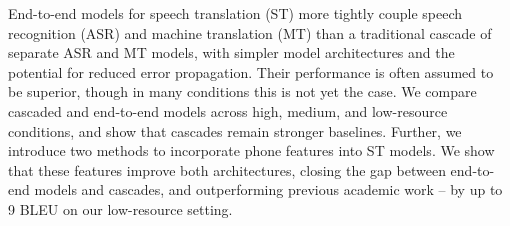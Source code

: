 End-to-end models for speech translation (ST) more tightly couple speech recognition (ASR) and machine translation (MT) than a traditional cascade of separate ASR and MT models, with simpler model architectures and the potential for reduced error propagation. Their performance is often assumed to be superior, though in many conditions this is not yet the case. We compare cascaded and end-to-end models across high, medium, and low-resource conditions, and show that cascades remain stronger baselines. Further, we introduce two methods to incorporate phone features into ST models. We show that these features improve both architectures, closing the gap between end-to-end models and cascades, and outperforming previous academic work -- by up to 9 BLEU on our low-resource setting.
